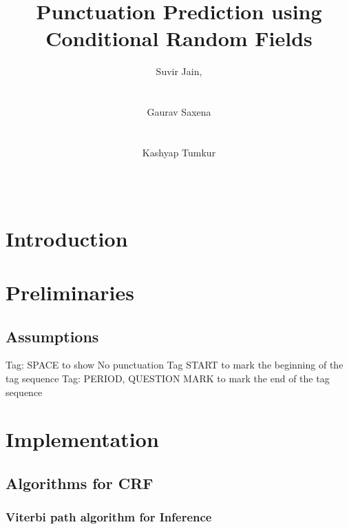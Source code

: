 \documentclass{acm_proc_article-sp}
\begin{document}
\title{Punctuation Prediction using Conditional Random Fields}

\author{
\alignauthor
Suvir Jain,\\
\\
\\
\alignauthor
Gaurav Saxena\\
\\
\\
\alignauthor
Kashyap Tumkur\\
\\
\\
}

\maketitle
\begin{abstract}
\end{abstract}

\section{Introduction}
\section{Preliminaries}
\subsection{Assumptions}
Tag: SPACE to show No punctuation
Tag START to mark the beginning of the tag sequence
Tag: PERIOD, QUESTION MARK to mark the end of the tag sequence

\section{Implementation}
\subsection{Algorithms for CRF}
\subsubsection*{Viterbi path algorithm for Inference}
\end{document}
